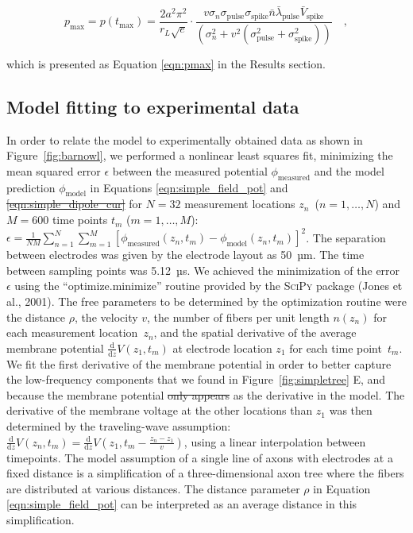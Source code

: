 \documentclass[]{article}
\providecommand{\DIFaddtex}[1]{{\protect\color{blue}\uwave{#1}}} %
\providecommand{\DIFdeltex}[1]{{\protect\color{red}\sout{#1}}}                      %
\providecommand{\DIFaddbegin}{} %
\providecommand{\DIFaddend}{} %
\providecommand{\DIFdelbegin}{} %
\providecommand{\DIFdelend}{} %
\providecommand{\DIFadd}[1]{\texorpdfstring{\DIFaddtex{#1}}{#1}} %
\providecommand{\DIFdel}[1]{\texorpdfstring{\DIFdeltex{#1}}{}} %
\begin{document}
\begin{equation}
p_\text{max} = p(t_\text{max}) = \frac{2 a^2
\pi^2}{r_L\sqrt{e}} \cdot \frac{v \sigma_n \sigma_{\text{pulse}}
\sigma_{\text{spike}} \bar{n} \bar{\lambda}_{\text{pulse}}
\bar{V}_{\text{spike}}} {\left(\sigma_n^2+v^2
\left(\sigma_{\text{pulse}}^2+\sigma_{\text{spike}}^2\right)\right)} \quad ,
\end{equation}

which is presented as Equation \ref{eqn:pmax} in the Results section.

\subsection{Model fitting to experimental
data}\label{model-fitting-to-experimental-data}

In order to relate the model to experimentally obtained data as shown in
Figure~\ref{fig:barnowl}, we performed a nonlinear least squares fit,
minimizing the mean squared error \(\epsilon\) between the measured
potential \(\phi_\text{measured}\) and the model prediction
\(\phi_\text{model}\) in Equations \ref{eqn:simple_field_pot} and
\DIFdelbegin \DIFdel{\ref{eqn:simple_dipole_cur} }\DIFdelend \DIFaddbegin \DIFadd{\ref{eqn:current} }\DIFaddend for \({N=32}\) measurement locations
\(z_n\)~(\(n=1,\dots,N\)) and \({M=600}\) time points \(t_m\)
(\(m = 1,\dots,M\)):
\(\epsilon = \frac{1}{NM}\sum_{n=1}^{N}\sum_{m=1}^{M}\left[\phi_\text{measured}(z_n,t_m)-\phi_\text{model}(z_n,t_m)\right]^2\).
The separation between electrodes was given by the electrode layout as
50~µm. The time between sampling points was 5.12~µs. We achieved the
minimization of the error \(\epsilon\) using the ``optimize.minimize''
routine provided by the \textsc{SciPy} package (Jones et al., 2001). The
free parameters to be determined by the optimization routine were the
distance \(\rho\), the velocity \(v\), the number of fibers per unit
length \(n(z_n)\) for each measurement location~\(z_n\), and the spatial
derivative of the average membrane potential
\(\frac{\text{d}}{\text{d}z}V(z_1,t_m)\) at electrode location \(z_1\)
for each time point~\(t_m\). We fit the first derivative of the membrane
potential in order to better capture the low-frequency components that
we found in Figure~\ref{fig:simpletree} E, and because the membrane
potential \DIFdelbegin \DIFdel{only appears }\DIFdelend \DIFaddbegin \DIFadd{appears only }\DIFaddend as the derivative in the model. The derivative of
the membrane voltage at the other locations than \(z_1\) was then
determined by the traveling-wave assumption:
\(\frac{\text{d}}{\text{d}z}V(z_n,t_m) = \frac{\text{d}}{\text{d}z}V(z_1,t_m-\frac{z_n-z_1}{v})\),
using a linear interpolation between timepoints. The model assumption of
a single line of axons with electrodes at a fixed distance is a
simplification of a three-dimensional axon tree where the fibers are
distributed at various distances. The distance parameter \(\rho\) in
Equation \ref{eqn:simple_field_pot} can be interpreted as an average
distance in this simplification.
\end{document}
